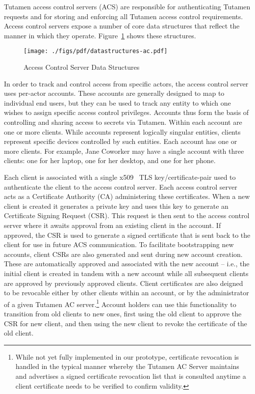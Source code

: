 Tutamen access control servers (ACS) are responsible for
authenticating Tutamen requests and for storing and enforcing all
Tutamen access control requirements. Access control servers expose a
number of core data structures that reflect the manner in which they
operate. Figure~\ref{fig:tutamen:acstructs} shows these structures.

\begin{figure}[thb]
  \centering
  \texttt{[image: ./figs/pdf/datastructures-ac.pdf]}
  \caption{Access Control Server Data Structures}
  \label{fig:tutamen:acstructs}
\end{figure}

In order to track and control access from specific actors, the access
control server uses per-actor accounts. These accounts are generally
designed to map to individual end users, but they can be used to track
any entity to which one wishes to assign specific access control
privileges. Accounts thus form the basis of controlling and sharing
access to secrets via Tutamen. Within each account are one or more
clients. While accounts represent logically singular entities, clients
represent specific devices controlled by such entities. Each account
has one or more clients. For example, Jane Coworker may have a single
account with three clients: one for her laptop, one for her desktop,
and one for her phone.

Each client is associated with a single x509~\cite{rfc5280} TLS
key/certificate-pair used to authenticate the client to the access
control server. Each access control server acts as a Certificate
Authority (CA) administering these certificates. When a new client is
created it generates a private key and uses this key to generate an
Certificate Signing Request (CSR). This request is then sent to the
access control server where it awaits approval from an existing client
in the account. If approved, the CSR is used to generate a signed
certificate that is sent back to the client for use in future ACS
communication. To facilitate bootstrapping new accounts, client CSRs
are also generated and sent during new account creation. These are
automatically approved and associated with the new account -- i.e.,
the initial client is created in tandem with a new account while all
subsequent clients are approved by previously approved clients. Client
certificates are also deigned to be revocable either by other clients
within an account, or by the administrator of a given Tutamen AC
server.\footnote{While not yet fully implemented in our prototype,
  certificate revocation is handled in the typical manner whereby the
  Tutamen AC Server maintains and advertises a signed certificate
  revocation list that is consulted anytime a client certificate needs
  to be verified to confirm validity.} Account holders can use this
functionality to transition from old clients to new ones, first using
the old client to approve the CSR for new client, and then using the
new client to revoke the certificate of the old client.

